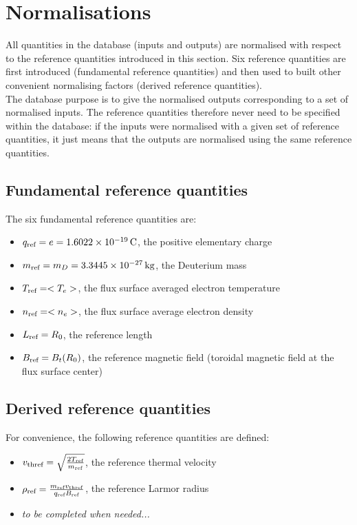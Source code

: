 \documentclass[fleqn]{report}
\begin{document}
\section{Normalisations}
All quantities in the database (inputs and outputs) are normalised with respect to the reference quantities introduced in this section. Six reference quantities are first introduced (fundamental reference quantities) and then used to built other convenient normalising factors (derived reference quantities).\\
The database purpose is to give the normalised outputs corresponding to a set of normalised inputs. The reference quantities therefore never need to be specified within the database: if the inputs were normalised with a given set of reference quantities, it just means that the outputs are normalised using the same reference quantities.

\subsection{Fundamental reference quantities}
The six fundamental reference quantities are:
\begin{itemize}
\item $q_{\textrm{ref}}=e=1.6022\times10^{-19}\,\textrm{C}$, the positive elementary charge
\item $m_{\textrm{ref}}=m_D=3.3445\times10^{-27}\,\textrm{kg}$, the Deuterium mass
\item $T_{\textrm{ref}}=<T_e>$, the flux surface averaged electron temperature
\item $n_{\textrm{ref}}=<n_e>$, the flux surface average electron density
\item $L_{\textrm{ref}}=R_0$, the reference length
\item $B_{\textrm{ref}}=B_t(R_0)$, the reference magnetic field (toroidal magnetic field at the flux surface center)
\end{itemize}

\subsection{Derived reference quantities}
For convenience, the following reference quantities are defined:
\begin{itemize}
\item $v_\textrm{thref}=\sqrt{\frac{2T_{\textrm{ref}}}{m_{\textrm{ref}}}}$, the reference thermal velocity
\item $\rho_{\textrm{ref}} = \frac{m_{\textrm{ref}} v_\textrm{thref}}{q_{\textrm{ref}} B_{\textrm{ref}}}$, the reference Larmor radius
\item \textit{to be completed when needed...}
\end{itemize}
\end{document}
